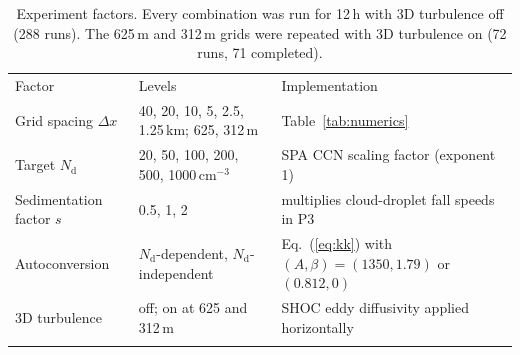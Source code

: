 \documentclass[acp, manuscript]{copernicus}
\newcommand{\Nd}{N_\mathrm{d}}
\newcommand{\dx}{\Delta x}
\newcommand{\cmthree}{\mathrm{cm^{-3}}}
\providecommand{\DIFaddbegin}{} %
\providecommand{\DIFaddend}{} %
\providecommand{\DIFdelbegin}{} %
\providecommand{\DIFdelend}{} %
\begin{document}
\DIFdelbegin %
\DIFdelend \DIFaddbegin \begin{table}[t]
\caption{Experiment factors. Every combination was run for 12\,h with 3D turbulence off (288 runs). The 625\,m and 312\,m grids were repeated with 3D turbulence on (72 runs, 71 completed).}\label{tab:design}
\begin{tabular}{lll}
\tophline
Factor & Levels & Implementation \\
\middlehline
Grid spacing $\dx$ & 40, 20, 10, 5, 2.5, 1.25\,km; 625, 312\,m & Table~\ref{tab:numerics} \\
Target $\Nd$ & 20, 50, 100, 200, 500, 1000\,$\cmthree$ & SPA CCN scaling factor (exponent 1) \\
Sedimentation factor $s$ & 0.5, 1, 2 & multiplies cloud-droplet fall speeds in P3 \\
Autoconversion & $\Nd$-dependent, $\Nd$-independent & Eq.~(\ref{eq:kk}) with $(A,\beta)=(1350,1.79)$ or $(0.812,0)$ \\
3D turbulence & off; on at 625 and 312\,m & SHOC eddy diffusivity applied horizontally \\
\bottomhline
\end{tabular}
\end{table}
\DIFaddend 
\end{document}
